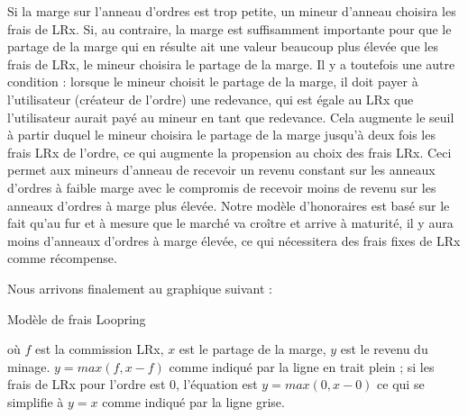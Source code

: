 \documentclass[UTF8,nofonts]{article}
\makeatletter
\newenvironment{figurehere}
 {\def\@captype{figure}}
 {}
\makeatother
\begin{document}
\begin{multicols}{2}
Si la marge sur l'anneau d'ordres est trop petite, un mineur d’anneau  choisira les frais de LRx. Si, au contraire, la marge est suffisamment importante pour que le partage de la marge qui en résulte ait une valeur beaucoup plus élevée que les frais de LRx, le mineur choisira le partage de la marge. Il y a toutefois une autre condition : lorsque le mineur choisit le partage de la marge, il doit payer à l'utilisateur (créateur de l'ordre) une redevance, qui est égale au LRx que l'utilisateur aurait payé au mineur en tant que redevance. Cela augmente le seuil à partir duquel le mineur choisira le partage de la marge jusqu'à deux fois les frais LRx de l'ordre, ce qui augmente la propension au choix des frais LRx. Ceci permet aux mineurs d'anneau de recevoir un revenu constant sur les anneaux d'ordres à faible marge avec le compromis de recevoir moins de revenu sur les anneaux d'ordres à marge plus élevée. Notre modèle d'honoraires est basé sur le fait qu'au fur et à mesure que le marché va croître et arrive à maturité, il y aura moins d'anneaux d'ordres à marge élevée, ce qui nécessitera des frais fixes de LRx comme récompense.


Nous arrivons finalement au graphique suivant :

\begin{center}
\begin{figurehere}
\centering
{}
\caption{Modèle de frais Loopring}
\label{fig:feemodel}
\end{figurehere}
\end{center}


où $f$ est la commission LRx, $x$ est le partage de la marge, $y$ est le revenu du minage. $y=max(f, x-f)$ comme indiqué par la ligne en trait plein ; si les frais de LRx pour l'ordre est $0$, l'équation est $y=max(0, x - 0)$ ce qui se simplifie à $y=x$ comme indiqué par la ligne grise.



\end{multicols}
\end{document}
